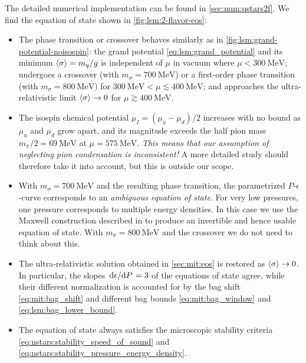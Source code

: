 The detailed numerical implementation can be found in \cref{sec:num:qstars2f}.
We find the equation of state shown in \cref{fig:lsm:2-flavor-eos}:
\begin{itemize}
\item The phase transition or crossover behaves similarly as in \cref{fig:lsm:grand-potential-noisospin}:
      the grand potential \eqref{eq:lsm:grand_potential} and its minimum $\langle \sigma \rangle=m_q/g$ is independent of $\mu$ in vacuum where $\mu < \SI{300}{\mega\electronvolt}$;
      undergoes a crossover (with $m_\sigma=\SI{700}{\mega\electronvolt}$) or a first-order phase transition (with $m_\sigma=\SI{800}{\mega\electronvolt}$) for $\SI{300}{\mega\electronvolt} < \mu \lesssim \SI{400}{\mega\electronvolt}$;
      and approaches the ultra-relativistic limit $\langle \sigma \rangle\rightarrow 0$ for $\mu \gtrsim \SI{400}{\mega\electronvolt}$.
\item The isospin chemical potential $\mu_I=(\mu_u-\mu_d)/2$ increases with no bound as $\mu_u$ and $\mu_d$ grow apart,
      and its magnitude exceeds the half pion mass $m_\pi/2 = \SI{69}{\mega\electronvolt}$ at $\mu = \SI{575}{\mega\electronvolt}$.
      \emph{This means that our assumption of neglecting pion condensation is inconsistent!}
      A more detailed study should therefore take it into account, but this is outside our scope.
\item With $m_\sigma=\SI{700}{\mega\electronvolt}$ and the resulting phase transition,
      the parametrized $P$-$\epsilon$-curve corresponds to an \emph{ambiguous equation of state}.
      For very low pressures, one pressure corresponds to multiple energy densities.
      In this case we use the Maxwell construction described in \cite[equation 4.69]{ref:master_francesco} to produce an invertible and hence usable equation of state.
      With $m_\sigma=\SI{800}{\mega\electronvolt}$ and the crossover we do not need to think about this.
\item The ultra-relativistic solution obtained in \cref{sec:mit:eos} is restored as $\langle \sigma \rangle \rightarrow 0$.
      In particular, the slopes $\odv{\epsilon}/{P} = 3$ of the equations of state agree,
      while their different normalization is accounted for by the bag shift \eqref{eq:mit:bag_shift} and different bag bounds \eqref{eq:mit:bag_window} and \eqref{eq:lsm:bag_lower_bound}.
\item The equation of state always satisfies the microscopic stability criteria \eqref{eq:nstars:stability_speed_of_sound} and \eqref{eq:nstars:stability_pressure_energy_density}.

\end{itemize}
